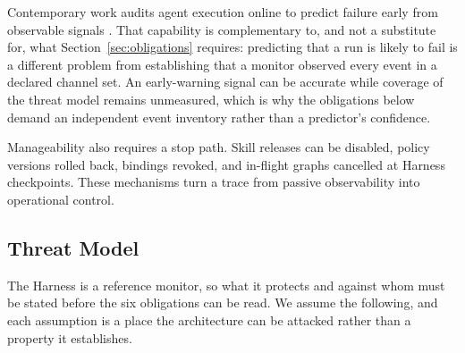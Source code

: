 \documentclass[11pt]{article}
\begin{document}
Contemporary work audits agent execution online to predict failure early from observable signals \cite{zhang2026agentforesight}. That capability is complementary to, and not a substitute for, what Section~\ref{sec:obligations} requires: predicting that a run is likely to fail is a different problem from establishing that a monitor observed every event in a declared channel set. An early-warning signal can be accurate while coverage of the threat model remains unmeasured, which is why the obligations below demand an independent event inventory rather than a predictor's confidence.

Manageability also requires a stop path. Skill releases can be disabled, policy versions rolled back, bindings revoked, and in-flight graphs cancelled at Harness checkpoints. These mechanisms turn a trace from passive observability into operational control.

\subsection{Threat Model}
\label{sec:threat-model}

The Harness is a reference monitor, so what it protects and against whom must be stated before the six obligations can be read. We assume the following, and each assumption is a place the architecture can be attacked rather than a property it establishes.
\end{document}
